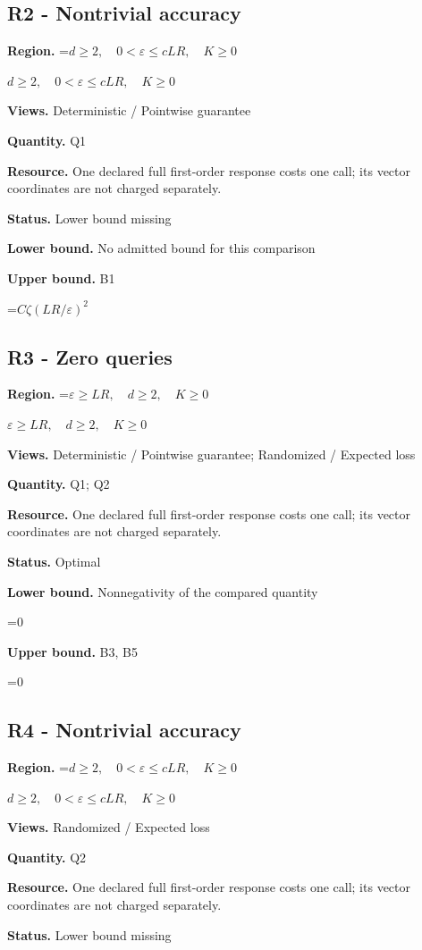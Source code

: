 \documentclass[10pt,a4paper]{article}
\newcommand{\AtlasMath}[1]{\par\begingroup\centering\setbox0=\hbox{$\displaystyle #1$}\ifdim\wd0>1.4\linewidth\typeout{ATLAS WIDE FORMULA: \the\wd0}\fi\ifdim\wd0>\linewidth\resizebox{\linewidth}{!}{\box0}\else\box0\fi\par\endgroup}
\newcommand{\AtlasInlineMath}[1]{\begingroup\setbox0=\hbox{$#1$}\ifdim\wd0>.4\linewidth\endgroup\AtlasMath{#1}\else\endgroup$#1$\fi}
\begin{document}
\subsection{R2 - Nontrivial accuracy}
\textbf{Region.} \AtlasInlineMath{d\ge2,\quad0<\varepsilon\le cLR,\quad K\ge0}

\textbf{Views.} Deterministic / Pointwise guarantee

\textbf{Quantity.} Q1

\textbf{Resource.} One declared full first-order response costs one call; its vector coordinates are not charged separately.

\textbf{Status.} Lower bound missing

\textbf{Lower bound.} No admitted bound for this comparison

\textbf{Upper bound.} B1

\AtlasMath{C\zeta(LR/\varepsilon)^2}
\subsection{R3 - Zero queries}
\textbf{Region.} \AtlasInlineMath{\varepsilon\ge LR,\quad d\ge2,\quad K\ge0}

\textbf{Views.} Deterministic / Pointwise guarantee; Randomized / Expected loss

\textbf{Quantity.} Q1; Q2

\textbf{Resource.} One declared full first-order response costs one call; its vector coordinates are not charged separately.

\textbf{Status.} Optimal

\textbf{Lower bound.} Nonnegativity of the compared quantity

\AtlasMath{0}
\textbf{Upper bound.} B3, B5

\AtlasMath{0}
\subsection{R4 - Nontrivial accuracy}
\textbf{Region.} \AtlasInlineMath{d\ge2,\quad0<\varepsilon\le cLR,\quad K\ge0}

\textbf{Views.} Randomized / Expected loss

\textbf{Quantity.} Q2

\textbf{Resource.} One declared full first-order response costs one call; its vector coordinates are not charged separately.

\textbf{Status.} Lower bound missing
\end{document}
